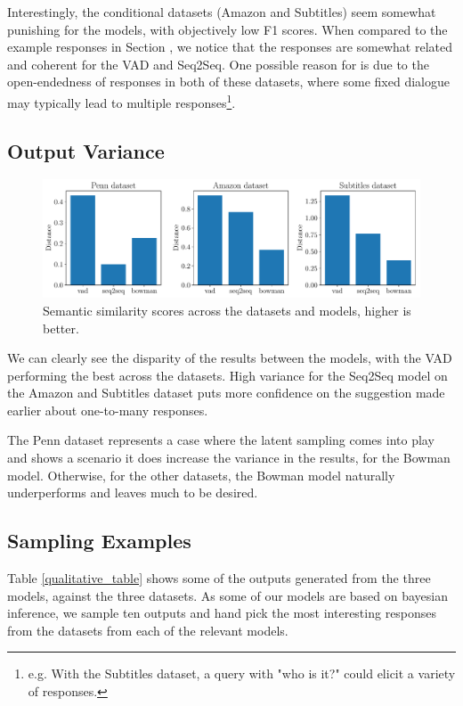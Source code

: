 \documentclass[12pt,twoside]{report}
\begin{document}
Interestingly, the conditional datasets (Amazon and Subtitles) seem somewhat punishing for the models, with objectively low F1 scores. When compared to the example responses in Section \label{sampling_examples}, we notice that the responses are somewhat related and coherent for the VAD and Seq2Seq. One possible reason for is due to the open-endedness of responses in both of these datasets, where some fixed dialogue may typically lead to multiple responses\footnote{e.g. With the Subtitles dataset, a query with "who is it?" could elicit a variety of responses.}.


\subsection{Output Variance}

\begin{figure}[!ht]
	\centering
	\includegraphics[width=150mm]{results/semantic_similarity.pdf}
	\caption{Semantic similarity scores across the datasets and models, higher is better.\label{r:variance}}
	\end{figure}

We can clearly see the disparity of the results between the models, with the VAD performing the best across the datasets. High variance for the Seq2Seq model on the Amazon and Subtitles dataset puts more confidence on the suggestion made earlier about one-to-many responses. 

The Penn dataset represents a case where the latent sampling comes into play and shows a scenario it does increase the variance in the results, for the Bowman model. Otherwise, for the other datasets, the Bowman model naturally underperforms and leaves much to be desired.

\subsection{Sampling Examples}
\label{sampling_examples}
Table \ref{qualitative_table} shows some of the outputs generated from the three models, against the three datasets. As some of our models are based on bayesian inference, we sample ten outputs and hand pick the most interesting responses from the datasets from each of the relevant models. 
\end{document}
